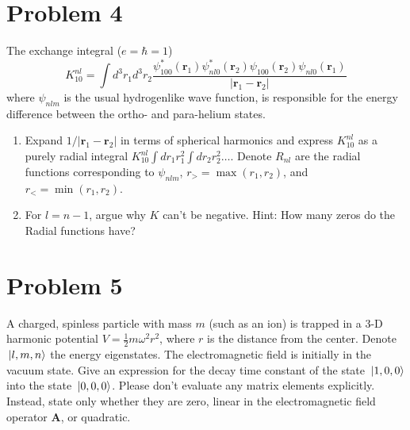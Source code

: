 \documentclass[10pt]{article}
\begin{document}
	\section*{Problem 4}
	The exchange integral (\( e = \hbar = 1 \)) 
	\[
	K_{10}^{nl} = \int d^3r_1 d^3r_2 \frac{\psi_{100}^{*}(\mathbf r_1) \psi_{nl 0}^{*}(\mathbf r_2)
	\psi_{100}(\mathbf r_2) \psi_{nl0}(\mathbf r_1)}{|\mathbf r_1 - \mathbf r_2|}
	\] 
	where \( \psi_{nlm} \) is the usual hydrogenlike wave function, is responsible for the energy difference 
	between the ortho- and para-helium states. 
	\begin{enumerate}[label=\alph*)]
		\item Expand \( 1 / |\mathbf r_1 - \mathbf r_2| \) in terms of spherical harmonics and express \( K_{10}^{nl} \) 
			as a purely radial integral \( K_{10}^{nl} \int dr_1 r_1^2 \int dr_2 r_2^2 \dots \). Denote \( R_{nl} \) 
			are the radial functions corresponding to \( \psi_{nlm} \), \( r_> = \max(r_1, r_2) \), and 
			\( r_< = \min(r_1, r_2)  \). 
		\item For \( l = n -1 \), argue why \( K \) can't be negative. Hint: How many zeros do the Radial functions 
			have? 
	\end{enumerate}
	\pagebreak
	\section*{Problem 5}
	A charged, spinless particle with mass \( m \) (such as an ion) is trapped in a 3-D harmonic 
	potential \( V = \frac{1}{2}m\omega^2 r^2 \), where \( r \) is the distance from the center. Denote 
	\( \ket*{l, m, n} \) the energy eigenstates. The electromagnetic field is initially in the vacuum state. Give 
	an expression for the decay time constant of the state \( \ket*{1, 0, 0} \) into the state \( \ket*{0, 0, 0} \). 
	Please don't evaluate any matrix elements explicitly. Instead, state only whether they are zero, linear 
	in the electromagnetic field operator \( \mathbf A \), or quadratic. 
\end{document}
